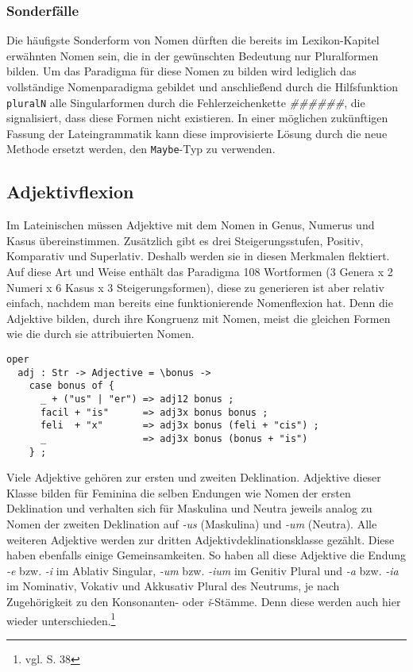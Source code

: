 \subsubsection{Sonderfälle}
Die häufigste Sonderform von Nomen dürften die bereits im Lexikon-Kapitel erwähnten Nomen sein, die in der gewünschten Bedeutung nur Pluralformen bilden. Um das Paradigma für diese Nomen zu bilden wird lediglich das vollständige Nomenparadigma gebildet und anschließend durch die Hilfsfunktion \texttt{pluralN} alle Singularformen durch die Fehlerzeichenkette \textit{\#\#\#\#\#\#}, die signalisiert, dass diese Formen nicht existieren. In einer möglichen zukünftigen Fassung der Lateingrammatik kann diese improvisierte Lösung durch die neue Methode ersetzt werden, den \texttt{Maybe}-Typ zu verwenden.
\subsection{Adjektivflexion}
\label{subsec:adjektiv}
Im Lateinischen müssen Adjektive mit dem Nomen in Genus, Numerus und Kasus übereinstimmen. Zusätzlich gibt es drei Steigerungsstufen, Positiv, Komparativ und Superlativ. Deshalb werden sie in diesen Merkmalen flektiert. Auf diese Art und Weise enthält das Paradigma 108 Wortformen (3 Genera x 2 Numeri x 6 Kasus x 3 Steigerungsformen), diese zu generieren ist aber relativ einfach, nachdem man bereits eine funktionierende Nomenflexion hat. Denn die Adjektive bilden, durch ihre Kongruenz mit Nomen, meist die gleichen Formen wie die durch sie attribuierten Nomen. \par
\begin{lstlisting}[float=h!tp,caption={Smart Paradigm für zwei Adjektivformen (vgl. \textbf{MorphoLat.gf})},label={GF-Morpho-Adj},basicstyle=\small]
oper
  adj : Str -> Adjective = \bonus ->
    case bonus of {
      _ + ("us" | "er") => adj12 bonus ;
      facil + "is"      => adj3x bonus bonus ;
      feli  + "x"       => adj3x bonus (feli + "cis") ;
      _                 => adj3x bonus (bonus + "is")
    } ;  
\end{lstlisting}
Viele Adjektive gehören zur ersten und zweiten Deklination. Adjektive dieser Klasse bilden für Feminina die selben Endungen wie Nomen der ersten Deklination und verhalten sich für Maskulina und Neutra jeweils analog zu Nomen der zweiten Deklination auf \textit{-us} (Maskulina) und \textit{-um} (Neutra). Alle weiteren Adjektive werden zur dritten Adjektivdeklinationsklasse gezählt. Diese haben ebenfalls einige Gemeinsamkeiten. So haben all diese Adjektive die Endung \textit{-e} bzw. \textit{-i} im Ablativ Singular, \textit{-um} bzw. \textit{-ium} im Genitiv Plural und \textit{-a} bzw. \textit{-ia} im Nominativ, Vokativ und Akkusativ Plural des Neutrums, je nach Zugehörigkeit zu den Konsonanten- oder \textit{ǐ}-Stämme. Denn diese werden auch hier wieder unterschieden.\footnote{vgl. \cite{BAYER-LINDAUER1994} S. 38} \par
